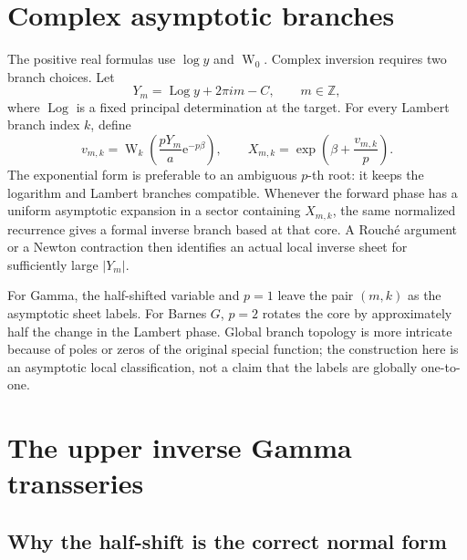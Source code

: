 \documentclass[11pt,oneside]{article}
\theoremstyle{plain}
\theoremstyle{definition}
\theoremstyle{remark}
\newcommand{\W}{\operatorname{W}}
\newcommand{\e}{\mathrm{e}}
\DeclareMathOperator{\Log}{Log}
\begin{document}
\section{Complex asymptotic branches}
\label{sec:complex-branches}

The positive real formulas use \(\log y\) and \(\W_0\).  Complex inversion
requires two branch choices.  Let
\begin{equation}
 Y_m=\Log y+2\pi i m-C,
 \qquad m\in\mathbb Z,
 \label{eq:Y-complex-branch}
\end{equation}
where \(\Log\) is a fixed principal determination at the target.  For every
Lambert branch index \(k\), define
\begin{equation}
 v_{m,k}=\W_k\!\left(
  \frac{pY_m}{a}\e^{-p\beta}
 \right),
 \qquad
 X_{m,k}=\exp\!\left(\beta+\frac{v_{m,k}}{p}\right).
 \label{eq:complex-core-branches}
\end{equation}
The exponential form is preferable to an ambiguous \(p\)-th root: it keeps
the logarithm and Lambert branches compatible.  Whenever the forward phase
has a uniform asymptotic expansion in a sector containing \(X_{m,k}\), the
same normalized recurrence gives a formal inverse branch based at that core.
A Rouch\'e argument or a Newton contraction then identifies an actual local
inverse sheet for sufficiently large \(|Y_m|\).

For Gamma, the half-shifted variable and \(p=1\) leave the pair \((m,k)\) as
the asymptotic sheet labels.  For Barnes \(G\), \(p=2\) rotates the core by
approximately half the change in the Lambert phase.  Global branch topology is
more intricate because of poles or zeros of the original special function;
the construction here is an asymptotic local classification, not a claim that
the labels are globally one-to-one.

\section{The upper inverse Gamma transseries}
\label{sec:gamma}

\subsection{Why the half-shift is the correct normal form}
\end{document}
